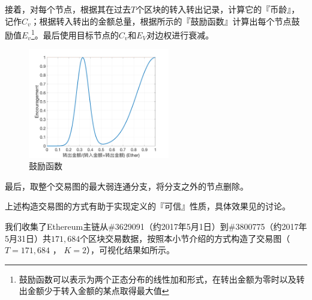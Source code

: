 接着，对每个节点，根据其在过去$T$个区块的转入转出记录，计算它的『币龄』，记作$C_v$；根据转入转出的金额总量，根据所示的『鼓励函数』计算出每个节点鼓励值$E_v$\footnote{鼓励函数可以表示为两个正态分布的线性加和形式，在转出金额为零时以及转出金额少于转入金额的某点取得最大值}。最后使用目标节点的$C_v$和$E_V$对边权进行衰减。

\begin{figure}
\centering
	\includegraphics[width=0.55\textwidth]{figs/encouragement.png}
	\caption{鼓励函数}\label{fig:encouragement}
\end{figure}


最后，取整个交易图的最大弱连通分支，将分支之外的节点删除。

上述构造交易图的方式有助于实现定义的『可信』性质，具体效果见的讨论。

我们收集了Ethereum主链从\#3629091（约2017年5月1日）到\#3800775（约2017年5月31日）共$171,684$个区块交易数据，按照本小节介绍的方式构造了交易图（$T=171,684$ ， $K=2$），可视化结果如所示。

